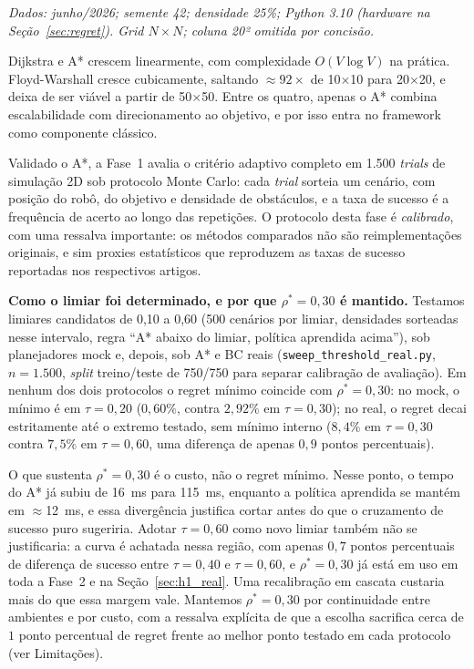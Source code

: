 \documentclass[12pt, a4paper]{article}
\begin{document}
\noindent\small\textit{Dados: junho/2026; semente 42; densidade 25\%; Python 3.10 (hardware na
Seção~\ref{sec:regret}). Grid $N{\times}N$; coluna 20² omitida por concisão.}

Dijkstra e A* crescem linearmente, com complexidade $O(V \log V)$ na prática. Floyd-Warshall
cresce cubicamente, saltando $\approx 92\times$ de 10$\times$10 para 20$\times$20, e deixa de ser
viável a partir de 50$\times$50. Entre os quatro, apenas o A* combina escalabilidade com
direcionamento ao objetivo, e por isso entra no framework como componente clássico.

Validado o A*, a Fase~1 avalia o critério adaptivo completo em 1.500 \textit{trials} de simulação
2D sob protocolo Monte Carlo: cada \textit{trial} sorteia um cenário, com posição do robô, do
objetivo e densidade de obstáculos, e a taxa de sucesso é a frequência de acerto ao longo das
repetições. O protocolo desta fase é \textit{calibrado}, com uma ressalva importante: os métodos
comparados não são reimplementações originais, e sim proxies estatísticos que reproduzem as taxas
de sucesso reportadas nos respectivos artigos.

\textbf{Como o limiar foi determinado, e por que $\rho^*{=}0{,}30$ é mantido.} Testamos limiares
candidatos de 0,10 a 0,60 (500 cenários por limiar, densidades sorteadas nesse intervalo, regra
``A* abaixo do limiar, política aprendida acima''), sob planejadores mock e, depois, sob A* e BC
reais (\texttt{sweep\_threshold\_real.py}, $n{=}1.500$, \textit{split} treino/teste de
750/750 para separar calibração de avaliação). Em nenhum dos dois protocolos o regret mínimo
coincide com $\rho^*{=}0{,}30$: no mock, o mínimo é em $\tau{=}0{,}20$ ($0{,}60\%$, contra
$2{,}92\%$ em $\tau{=}0{,}30$); no real, o regret decai estritamente até o extremo testado, sem
mínimo interno ($8{,}4\%$ em $\tau{=}0{,}30$ contra $7{,}5\%$ em $\tau{=}0{,}60$, uma diferença de
apenas $0{,}9$ pontos percentuais).

O que sustenta $\rho^*{=}0{,}30$ é o custo, não o regret mínimo. Nesse ponto, o tempo do A* já
subiu de 16~ms para 115~ms, enquanto a política aprendida se mantém em $\approx$12~ms, e essa
divergência justifica cortar antes do que o cruzamento de sucesso puro sugeriria. Adotar
$\tau{=}0{,}60$ como novo limiar também não se justificaria: a curva é achatada nessa região,
com apenas $0{,}7$ pontos percentuais de diferença de sucesso entre $\tau{=}0{,}40$ e
$\tau{=}0{,}60$, e $\rho^*{=}0{,}30$ já está em uso em toda a Fase~2 e na
Seção~\ref{sec:h1_real}. Uma recalibração em cascata custaria mais do que essa margem vale.
Mantemos $\rho^*{=}0{,}30$ por continuidade entre ambientes e por custo, com a ressalva explícita
de que a escolha sacrifica cerca de $1$ ponto percentual de regret frente ao melhor ponto testado
em cada protocolo (ver Limitações).
\end{document}
